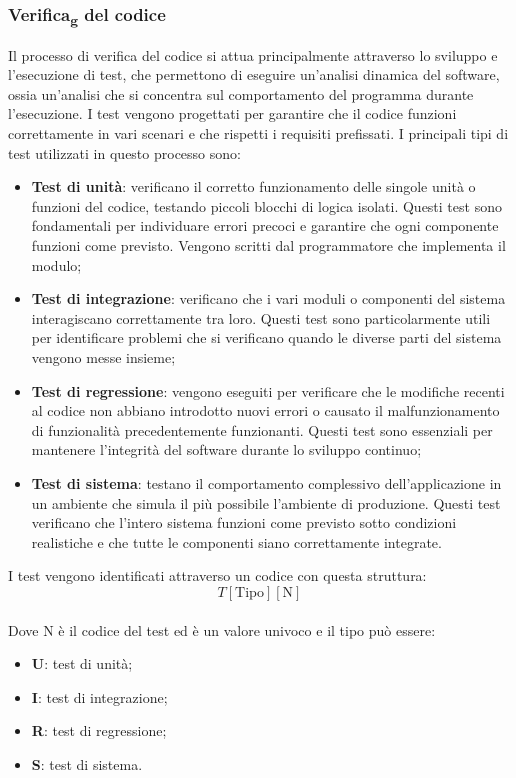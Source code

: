        \subsubsection{Verifica\textsubscript{g} del codice}
        Il processo di verifica del codice si attua principalmente attraverso lo sviluppo e l'esecuzione di test, che permettono di eseguire un'analisi dinamica del software, ossia un'analisi che si concentra sul comportamento del programma durante l'esecuzione. I test vengono progettati per garantire che il codice funzioni correttamente in vari scenari e che rispetti i requisiti prefissati. I principali tipi di test utilizzati in questo processo sono:
        \begin{itemize}
            \item \textbf{Test di unità}: verificano il corretto funzionamento delle singole unità o funzioni del codice, testando piccoli blocchi di logica isolati. Questi test sono fondamentali per individuare errori precoci e garantire che ogni componente funzioni come previsto. Vengono scritti dal programmatore che implementa il modulo;
            \item \textbf{Test di integrazione}: verificano che i vari moduli o componenti del sistema interagiscano correttamente tra loro. Questi test sono particolarmente utili per identificare problemi che si verificano quando le diverse parti del sistema vengono messe insieme;
            \item \textbf{Test di regressione}: vengono eseguiti per verificare che le modifiche recenti al codice non abbiano introdotto nuovi errori o causato il malfunzionamento di funzionalità precedentemente funzionanti. Questi test sono essenziali per mantenere l'integrità del software durante lo sviluppo continuo;
            \item \textbf{Test di sistema}: testano il comportamento complessivo dell'applicazione in un ambiente che simula il più possibile l'ambiente di produzione. Questi test verificano che l'intero sistema funzioni come previsto sotto condizioni realistiche e che tutte le componenti siano correttamente integrate.
        \end{itemize}   
        I test vengono identificati attraverso un codice con questa struttura:
        \textbf{
            \[
            T[\text{Tipo}][ \text{N}]
            \]
            }
        \\Dove N è il codice del test ed è un valore univoco e il tipo può essere:
        \begin{itemize}
            \item \textbf{U}: test di unità;
            \item \textbf{I}: test di integrazione;
            \item \textbf{R}: test di regressione;
            \item \textbf{S}: test di sistema.  
        \end{itemize}
